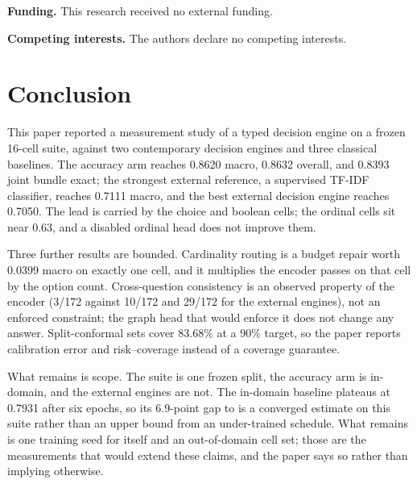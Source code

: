 \textbf{Funding.} This research received no external funding.

\textbf{Competing interests.} The authors declare no competing interests.

\section{Conclusion}
\label{sec:conclusion}

This paper reported a measurement study of a typed decision engine on a frozen 16-cell suite,
against two contemporary decision engines and three classical baselines. The accuracy arm reaches
0.8620 macro, 0.8632 overall, and 0.8393 joint bundle exact; the strongest external reference, a
supervised TF-IDF classifier, reaches 0.7111 macro, and the best external decision engine reaches
0.7050. The lead is carried by the choice and boolean cells; the ordinal cells sit near 0.63, and a
disabled ordinal head does not improve them.

Three further results are bounded. Cardinality routing is a budget repair worth 0.0399 macro on
exactly one cell, and it multiplies the encoder passes on that cell by the option count.
Cross-question consistency is an observed property of the encoder (3/172 against 10/172 and 29/172
for the external engines), not an enforced constraint; the graph head that would enforce it does not
change any answer. Split-conformal sets cover 83.68\% at a 90\% target, so the paper reports
calibration error and risk--coverage instead of a coverage guarantee.

What remains is scope. The suite is one frozen split, the accuracy arm is in-domain, and the
external engines are not. The in-domain baseline plateaus at 0.7931 after six epochs, so its
6.9-point gap to \vsix{} is a converged estimate on this suite rather than an upper bound from an
under-trained schedule. What remains is one training seed for \vsix{} itself and an out-of-domain
cell set; those are the measurements that would extend these claims, and the paper says so rather
than implying otherwise.
